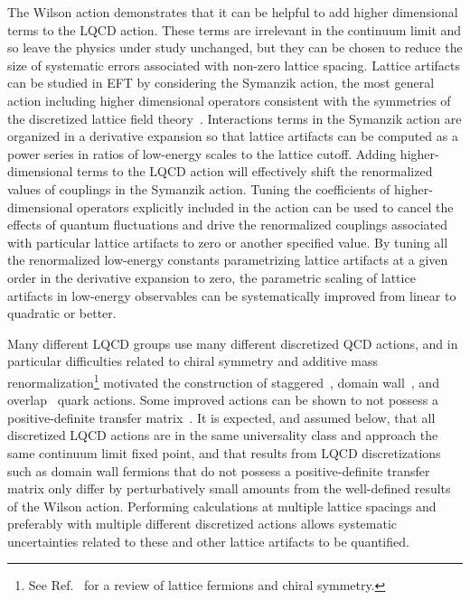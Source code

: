 The Wilson action demonstrates that it can be helpful to add higher dimensional terms to the LQCD action.
These terms are irrelevant in the continuum limit and so leave the physics under study unchanged, but they can be chosen to reduce the size of systematic errors associated with non-zero lattice spacing.
Lattice artifacts can be studied in EFT by considering the Symanzik action, the most general action including higher dimensional operators consistent with the symmetries of the discretized lattice field theory~\cite{Symanzik:1983dc}.
Interactions terms in the Symanzik action are organized in a derivative expansion so that lattice artifacts can be computed as a power series in ratios of low-energy scales to the lattice cutoff.
Adding higher-dimensional terms to the LQCD action will effectively shift the renormalized values of couplings in the Symanzik action.
Tuning the coefficients of higher-dimensional operators explicitly included in the action can be used to cancel the effects of quantum fluctuations and drive the renormalized couplings associated with particular lattice artifacts to zero or another specified value.
By tuning all the renormalized low-energy constants parametrizing lattice artifacts at a given order in the derivative expansion to zero, the parametric scaling of lattice artifacts in low-energy observables can be systematically improved from linear to quadratic or better.


Many different LQCD groups use many different discretized QCD actions, and in particular difficulties related to chiral symmetry and additive mass renormalization\footnote{See Ref.~\cite{Kaplan:2009yg} for a review of lattice fermions and chiral symmetry.} motivated the construction of staggered~\cite{Kogut:1974ag}, domain wall~\cite{Kaplan:1992bt,Shamir:1993zy,Furman:1994ky}, and overlap~\cite{Narayanan:1993sk,Narayanan:1994gw,Neuberger:1997fp} quark actions.
Some improved actions can be shown to not possess a positive-definite transfer matrix~\cite{Luscher:1984is}.
It is expected, and assumed below, that all discretized LQCD actions are in the same universality class and approach the same continuum limit fixed point, and that
results from LQCD discretizations such as domain wall fermions that do not possess a positive-definite transfer matrix only differ by perturbatively small amounts from the well-defined results of the Wilson action.
Performing calculations at multiple lattice spacings and preferably with multiple different discretized actions allows systematic uncertainties related to these and other lattice artifacts to be quantified.


